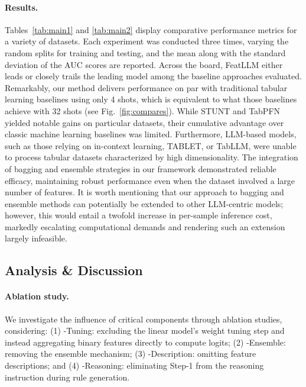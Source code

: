 \vspace*{-0.12in}
\paragraph{Results.}
Tables~\ref{tab:main1} and \ref{tab:main2} display comparative performance metrics for a variety of datasets. Each experiment was conducted three times, varying the random splits for training and testing, and the mean along with the standard deviation of the AUC scores are reported. Across the board, \textsf{FeatLLM} either leads or closely trails the leading model among the baseline approaches evaluated. Remarkably, our method delivers performance on par with traditional tabular learning baselines using only 4 shots, which is equivalent to what those baselines achieve with 32 shots (see Fig.~\ref{fig:compares}). While STUNT and TabPFN yielded notable gains on particular datasets, their cumulative advantage over classic machine learning baselines was limited. Furthermore, LLM-based models, such as those relying on in-context learning, TABLET, or TabLLM, were unable to process tabular datasets characterized by high dimensionality. The integration of bagging and ensemble strategies in our framework demonstrated reliable efficacy, maintaining robust performance even when the dataset involved a large number of features. It is worth mentioning that our approach to bagging and ensemble methods can potentially be extended to other LLM-centric models; however, this would entail a twofold increase in per-sample inference cost, markedly escalating computational demands and rendering such an extension largely infeasible. 

\subsection{Analysis \& Discussion}
\label{sec:analysis}
\paragraph{Ablation study.} We investigate the influence of critical components through ablation studies, considering: (1) \textsf{-Tuning}: excluding the linear model’s weight tuning step and instead aggregating binary features directly to compute logits; (2) \textsf{-Ensemble}: removing the ensemble mechanism; (3) \textsf{-Description}: omitting feature descriptions; and (4) \textsf{-Reasoning}: eliminating Step-1 from the reasoning instruction during rule generation.

